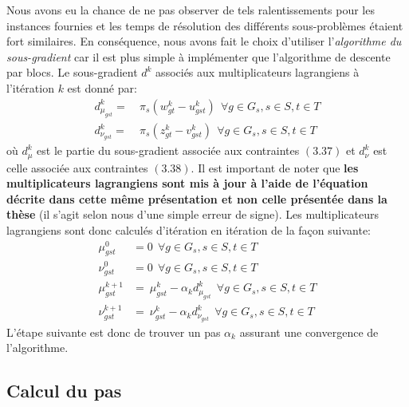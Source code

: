 Nous avons eu la chance de ne pas observer de tels ralentissements pour les instances fournies et les temps de résolution des différents
sous-problèmes étaient fort similaires. En conséquence, nous avons fait le choix d'utiliser l'\textit{algorithme du sous-gradient} car il est
plus simple à implémenter que l'algorithme de descente par blocs.
Le sous-gradient $d^k$ associés aux multiplicateurs lagrangiens à l'itération $k$ est donné par:
\begin{align}
    d_{\mu_{gst}}^k = & \ \pi_s (w_{gt}^k - u_{gst}^k) \ \  \forall g \in G_s, s \in S, t \in T \\
    d_{\nu_{gst}}^k = & \ \pi_s (z_{gt}^k - v_{gst}^k) \ \  \forall g \in G_s, s \in S, t \in T
\end{align}
où $d_{\mu}^k$ est le partie du sous-gradient associée aux contraintes $(3.37)$ et $d_{\nu}^k$ est celle associée aux contraintes $(3.38)$.
Il est important de noter que \textbf{les multiplicateurs lagrangiens sont mis à jour à l'aide de l'équation décrite dans cette même présentation
et non celle présentée dans la thèse} \citep{Papavasiliou12couplingrenewable} (il s'agit selon nous d'une simple erreur de signe).
Les multiplicateurs lagrangiens sont donc calculés d'itération en itération de la façon suivante:
\begin{align}
    \mu_{gst}^{0} & = 0 \ \  \forall g \in G_s, s \in S, t \in T \\
    \nu_{gst}^{0} & = 0 \ \  \forall g \in G_s, s \in S, t \in T \\
    \mu_{gst}^{k+1} & = \ \mu_{gst}^{k} - \alpha_k d_{\mu_{gst}}^k \ \  \forall g \in G_s, s \in S, t \in T \\
    \nu_{gst}^{k+1} & = \ \nu_{gst}^{k} - \alpha_k d_{\nu_{gst}}^k \ \  \forall g \in G_s, s \in S, t \in T
\end{align}
L'étape suivante est donc de trouver un pas $\alpha_k$ assurant une convergence de l'algorithme.


\subsection{Calcul du pas}

